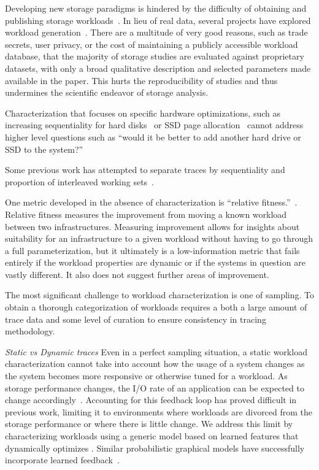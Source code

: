 Developing new storage paradigms is hindered by the difficulty of obtaining and
publishing storage workloads~\cite{ian-tos}. In lieu of real data, several projects
have explored workload
generation~\cite{tarasov2012extracting,ganger1995generating,kurmas2003synthesizing,gomez2000new}.
There are a multitude of very good reasons, such as trade secrets, user
privacy, or the cost of maintaining a publicly accessible workload database,
that the majority of storage studies are evaluated against proprietary
datasets, with only a broad qualitative description and selected parameters made
available in the paper. This hurts the reproducibility of
studies and thus undermines the scientific endeavor of storage analysis.%

Characterization that focuses on specific hardware optimizations, such as
increasing sequentiality for hard disks~\cite{riska2006disk} or SSD page
allocation~\cite{seo_char} cannot address higher level questions such as ``would
it be better to add another hard drive or SSD to the system?''

Some previous work has attempted to separate traces by sequentiality and
proportion of interleaved working sets~\cite{seo_char}.  %

One metric developed in the absence of characterization is ``relative
fitness.''~\cite{mesnier07}.  Relative fitness measures the improvement from
moving a known workload between two infrastructures.  Measuring improvement
allows for insights about suitability for an infrastructure to a given workload
without having to go through a full parameterization, but it ultimately is a
low-information metric that fails entirely if the workload properties are
dynamic or if the systems in question are vastly different.  It also does not
suggest further areas of improvement.

The most significant challenge to workload characterization is one of sampling.  To obtain
a thorough categorization of workloads requires a both a large amount of trace
data and some level of curation to ensure consistency in tracing methodology.


\textit{Static vs Dynamic traces} 
Even in a perfect sampling situation, a static workload characterization cannot
take into account how the usage of a system changes as the system becomes more
responsive or otherwise tuned for a workload.  As storage performance changes,
the I/O rate of an application can be expected to change
accordingly~\cite{mesnier05}.  Accounting for this feedback loop has proved
difficult in previous work, limiting it to environments where workloads are
divorced from the storage performance or where there is little change.
We address this limit by characterizing workloads using a generic model based on
learned features that dynamically optimizes \systemfit.  Similar probabilistic
graphical models have successfully incorporate learned
feedback~\cite{liu2012feedback}.  %

